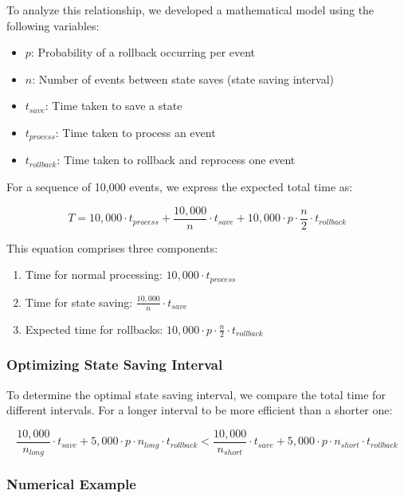To analyze this relationship, we developed a mathematical model using the following variables:

\begin{itemize}
    \item $p$: Probability of a rollback occurring per event
    \item $n$: Number of events between state saves (state saving interval)
    \item $t_{save}$: Time taken to save a state
    \item $t_{process}$: Time taken to process an event
    \item $t_{rollback}$: Time taken to rollback and reprocess one event
\end{itemize}

For a sequence of 10,000 events, we express the expected total time as:

\begin{equation}
    T = 10,000 \cdot t_{process} + \frac{10,000}{n} \cdot t_{save} + 10,000 \cdot p \cdot \frac{n}{2} \cdot t_{rollback}
\end{equation}

This equation comprises three components:
\begin{enumerate}
    \item Time for normal processing: $10,000 \cdot t_{process}$
    \item Time for state saving: $\frac{10,000}{n} \cdot t_{save}$
    \item Expected time for rollbacks: $10,000 \cdot p \cdot \frac{n}{2} \cdot t_{rollback}$
\end{enumerate}

\subsubsection{Optimizing State Saving Interval}

To determine the optimal state saving interval, we compare the total time for different intervals. For a longer interval to be more efficient than a shorter one:

\begin{equation}
    \frac{10,000}{n_{long}} \cdot t_{save} + 5,000 \cdot p \cdot n_{long} \cdot t_{rollback} < 
    \frac{10,000}{n_{short}} \cdot t_{save} + 5,000 \cdot p \cdot n_{short} \cdot t_{rollback}
\end{equation}

\subsubsection{Numerical Example}

